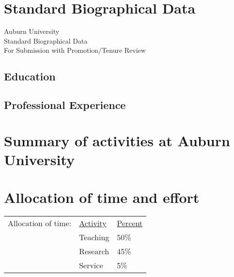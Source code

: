


\newcommand{\longcontent}[1]{#1}

\newcommand{\oldcontent}[1]{}

\newcommand{\docTitle}{Biographical Data\xspace}


\singlespacing

\tableofcontents

\newpage

\section{Standard Biographical Data}

\bigskip
\begin{mytitle}
    Auburn University \\
    Standard Biographical Data \\
    For Submission with Promotion/Tenure Review
\end{mytitle}

\bigskip


\bigskip
\subsection*{Education}


\bigskip
\subsection*{Professional Experience}


\newpage

\section{Summary of activities at Auburn University}


\newpage


\section{Allocation of time and effort}
\begin{tabular}{ l l l }
    Allocation of time: & \underline{Activity} & \underline{Percent} \\
    & Teaching & 50\% \\
    & Research & 45\% \\
    & Service & 5\% \\
\end{tabular}


